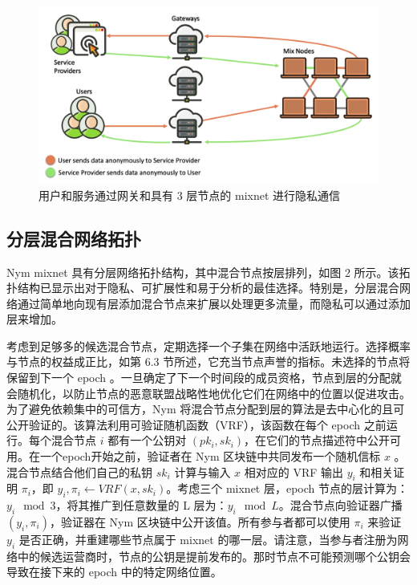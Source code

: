 \documentclass{article}
\begin{document}
\begin{figure}
\centering
\includegraphics[width=1\textwidth]{image2.png} %
\caption{用户和服务通过网关和具有 3 层节点的 mixnet 进行隐私通信} %
\label{图 2} %
\end{figure}

	\subsection{分层混合网络拓扑}
	
	Nym mixnet 具有分层网络拓扑结构，其中混合节点按层排列，如图 2 所示。该拓扑结构已显示出对于隐私、可扩展性和易于分析的最佳选择\cite{ref7, ref36}。特别是，分层混合网络通过简单地向现有层添加混合节点来扩展以处理更多流量，而隐私可以通过添加层来增加。\newline

	考虑到足够多的候选混合节点，定期选择一个子集在网络中活跃地运行。选择概率与节点的权益成正比，如第 6.3 节所述，它充当节点声誉的指标。未选择的节点将保留到下一个 epoch 。一旦确定了下一个时间段的成员资格，节点到层的分配就会随机化，以防止节点的恶意联盟战略性地优化它们在网络中的位置以促进攻击。为了避免依赖集中的可信方，Nym 将混合节点分配到层的算法是去中心化的且可公开验证的。该算法利用可验证随机函数（VRF）\cite{ref80}，该函数在每个 epoch 之前运行。每个混合节点 $i$ 都有一个公钥对 $\left ( pk_{i}, sk_{i} \right )$，在它们的节点描述符中公开可用。在一个epoch开始之前，验证者在 Nym 区块链中共同发布一个随机信标 $x$ 。混合节点结合他们自己的私钥 $sk_{i}$ 计算与输入 $x$ 相对应的 VRF 输出 $y_{i}$ 和相关证明 $\pi_{i}$，即 $y_{i},\pi_{i}\leftarrow VRF(x,sk_{i})$。考虑三个 mixnet 层，epoch 节点的层计算为：$y_{i} \mod 3$，将其推广到任意数量的 L 层为：$y_{i} \mod L$。混合节点向验证器广播 $(y_{i}, \pi_{i})$，验证器在 Nym 区块链中公开该值。所有参与者都可以使用 $\pi_{i}$ 来验证 $y_{i}$ 是否正确，并重建哪些节点属于 mixnet 的哪一层。请注意，当参与者注册为网络中的候选运营商时，节点的公钥是提前发布的。那时节点不可能预测哪个公钥会导致在接下来的 epoch 中的特定网络位置。\newline
\end{document}
